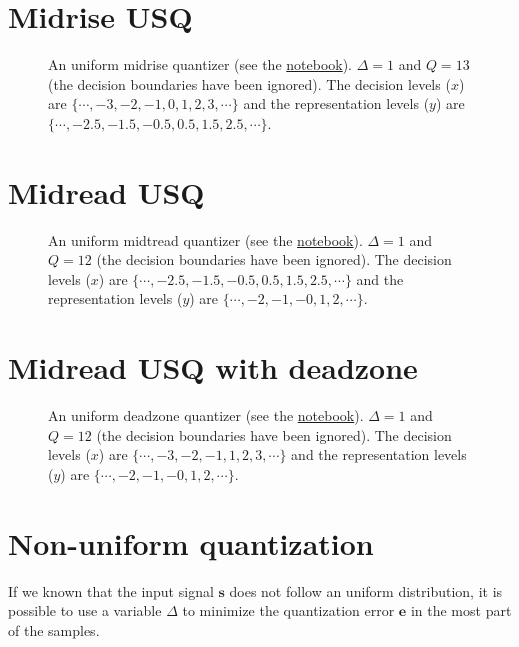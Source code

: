 
\section{Midrise USQ}
\begin{figure}
  \caption{An uniform midrise quantizer (see the
    \href{https://nbviewer.jupyter.org/github/vicente-gonzalez-ruiz/quantization/blob/master/graphics/midrise.ipynb}{notebook}). $\Delta=1$
    and $Q=13$ (the decision boundaries have been ignored). The
    decision levels ($x$) are $\{\cdots,-3,-2,-1,0,1,2,3,\cdots\}$
    and the representation levels ($y$) are
    $\{\cdots,-2.5,-1.5,-0.5,0.5,1.5,2.5,\cdots\}$.}
  \label{fig:midrise}
\end{figure}

\section{Midread USQ}
\begin{figure}
  \caption{An uniform midtread quantizer (see the
    \href{https://nbviewer.jupyter.org/github/vicente-gonzalez-ruiz/quantization/blob/master/graphics/midtread.ipynb}{notebook}). $\Delta=1$
    and $Q=12$ (the decision boundaries have been ignored). The
    decision levels ($x$) are $\{\cdots,-2.5,-1.5,-0.5,0.5,1.5,2.5,\cdots\}$
    and the representation levels ($y$) are
    $\{\cdots,-2,-1,-0,1,2,\cdots\}$.}
  \label{fig:midtread}
\end{figure}

\section{Midread USQ with deadzone}
\begin{figure}
  \caption{An uniform deadzone quantizer (see the
    \href{https://nbviewer.jupyter.org/github/vicente-gonzalez-ruiz/quantization/blob/master/graphics/deadzone.ipynb}{notebook}). $\Delta=1$
    and $Q=12$ (the decision boundaries have been ignored). The
    decision levels ($x$) are $\{\cdots,-3,-2,-1,1,2,3,\cdots\}$
    and the representation levels ($y$) are
    $\{\cdots,-2,-1,-0,1,2,\cdots\}$.}
  \label{fig:deadzone}
\end{figure}

\section{Non-uniform quantization}
If we known that the input signal ${\mathbf s}$ does not follow an
uniform distribution, it is possible to use a variable $\Delta$ to
minimize the quantization error ${\mathbf e}$ in the most part of the
samples.

